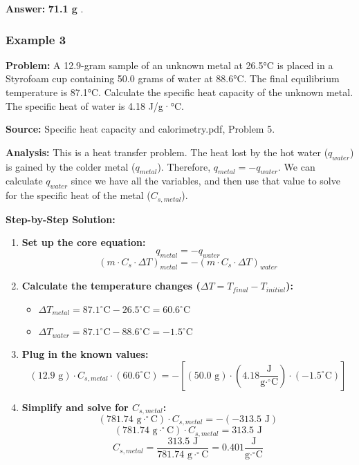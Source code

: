 \documentclass{article}
\begin{document}
\textbf{Answer:} \textbf{71.1 g }.

\subsubsection{Example 3}
\textbf{Problem:} A 12.9-gram sample of an unknown metal at 26.5°C is placed in a Styrofoam cup containing 50.0 grams of water at 88.6°C. The final equilibrium temperature is 87.1°C. Calculate the specific heat capacity of the unknown metal. The specific heat of water is 4.18 J/g·°C.

\textbf{Source:} Specific heat capacity and calorimetry.pdf, Problem 5.

\textbf{Analysis:} This is a heat transfer problem. The heat lost by the hot water ($q_{water}$) is gained by the colder metal ($q_{metal}$). Therefore, $q_{metal} = -q_{water}$. We can calculate $q_{water}$ since we have all the variables, and then use that value to solve for the specific heat of the metal ($C_{s, metal}$).

\textbf{Step-by-Step Solution:}
\begin{enumerate}
    \item \textbf{Set up the core equation:}
    \[ q_{metal} = -q_{water} \]
    \[ (m \cdot C_s \cdot \Delta T)_{metal} = -(m \cdot C_s \cdot \Delta T)_{water} \]
    \item \textbf{Calculate the temperature changes ($\Delta T = T_{final} - T_{initial}$):}
    \begin{itemize}
        \item $\Delta T_{metal} = 87.1^\circ\text{C} - 26.5^\circ\text{C} = 60.6^\circ\text{C}$
        \item $\Delta T_{water} = 87.1^\circ\text{C} - 88.6^\circ\text{C} = -1.5^\circ\text{C}$
    \end{itemize}
    \item \textbf{Plug in the known values:}
    \[ (12.9 \text{ g}) \cdot C_{s, metal} \cdot (60.6^\circ\text{C}) = -[(50.0 \text{ g}) \cdot (4.18 \frac{\text{J}}{\text{g}\cdot^\circ\text{C}}) \cdot (-1.5^\circ\text{C})] \]
    \item \textbf{Simplify and solve for $C_{s, metal}$:}
    \[ (781.74 \text{ g}\cdot^\circ\text{C}) \cdot C_{s, metal} = -(-313.5 \text{ J}) \]
    \[ (781.74 \text{ g}\cdot^\circ\text{C}) \cdot C_{s, metal} = 313.5 \text{ J} \]
    \[ C_{s, metal} = \frac{313.5 \text{ J}}{781.74 \text{ g}\cdot^\circ\text{C}} = 0.401 \frac{\text{J}}{\text{g}\cdot^\circ\text{C}} \]
\end{enumerate}
\end{document}
